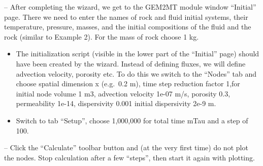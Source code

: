 \documentclass[
]{book}
\begin{document}
-- After completing the wizard, we get to the GEM2MT module window ``Initial'' page. There we need to enter the names of rock and fluid initial systems, their temperature, pressure, masses, and the initial compositions of the fluid and the rock (similar to Example 2). For the mass of rock choose 1 kg.

\begin{itemize}
\item
  The initialization script (visible in the lower part of the ``Initial'' page) should have been created by the wizard. Instead of defining fluxes, we will define advection velocity, porosity etc. To do this we switch to the ``Nodes'' tab and choose spatial dimension x (e.g.~0.2 m), time step reduction factor 1,for initial node volume 1 m3, advection velocity 1e-07 m/s, porosity 0.3, permeability 1e-14, dispersivity 0.001 initial dispersivity 2e-9 m.
\item
  Switch to tab ``Setup'', choose 1,000,000 for total time mTau and a step of 100.
\end{itemize}

-- Click the ``Calculate'' toolbar button and (at the very first time) do not plot the nodes. Stop calculation after a few ``steps'', then start it again with plotting.

  
\end{document}
